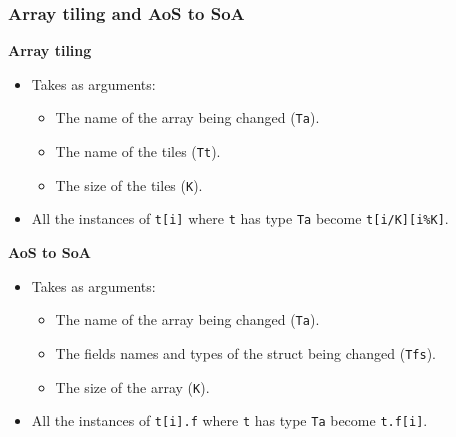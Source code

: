 \begin{frame}[fragile]
\frametitle{}


\end{frame}


\begin{frame}[fragile]
\frametitle{Array tiling and AoS to SoA}

\textbf{Array tiling}
\begin{itemize}
	\item Takes as arguments:
	\begin{itemize}
		\item The name of the array being changed (\texttt{Ta}).
		\item The name of the tiles (\texttt{Tt}).
		\item The size of the tiles (\texttt{K}).
	\end{itemize}
	\item All the instances of \texttt{t[i]} where \texttt{t} has type \texttt{Ta} become \texttt{t[i/K][i\%K]}.
\end{itemize}

\bigskip

\textbf{AoS to SoA}
\begin{itemize}
	\item Takes as arguments:
	\begin{itemize}
		\item The name of the array being changed (\texttt{Ta}).
		\item The fields names and types of the struct being changed (\texttt{Tfs}).
		\item The size of the array (\texttt{K}).
	\end{itemize}
	\item All the instances of \texttt{t[i].f} where \texttt{t} has type \texttt{Ta} become \texttt{t.f[i]}.
\end{itemize}

\end{frame}


